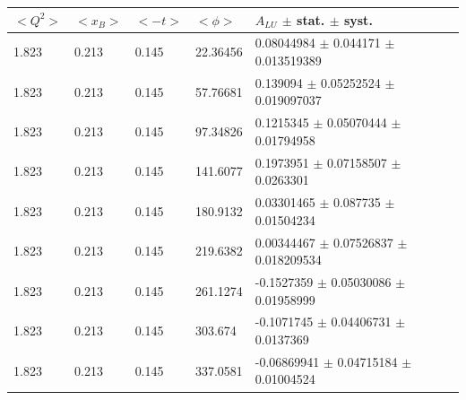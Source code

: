 \begin{table}[!h]
   \begin{center}
      \begin{tabular}{||l|l|l|l|l||}
         \hline
 $<Q^{2}>$ & $<x_{B}>$ & $<-t>$ & $<\phi>$ & $A_{LU}$ $\pm$ stat. $\pm$ syst.\\
  \hline
   1.823 & 0.213 & 0.145 &   22.36456  &   0.08044984  $\pm$  0.044171     $\pm$  0.013519389    \\
   1.823 & 0.213 & 0.145 &   57.76681  &   0.139094    $\pm$  0.05252524   $\pm$  0.019097037    \\
   1.823 & 0.213 & 0.145 &   97.34826  &   0.1215345   $\pm$  0.05070444   $\pm$  0.01794958     \\
   1.823 & 0.213 & 0.145 &   141.6077  &   0.1973951   $\pm$  0.07158507   $\pm$  0.0263301      \\
   1.823 & 0.213 & 0.145 &   180.9132  &   0.03301465  $\pm$  0.087735     $\pm$  0.01504234     \\
   1.823 & 0.213 & 0.145 &   219.6382  &   0.00344467  $\pm$  0.07526837   $\pm$  0.018209534    \\
   1.823 & 0.213 & 0.145 &   261.1274  &  -0.1527359   $\pm$  0.05030086   $\pm$  0.01958999     \\
   1.823 & 0.213 & 0.145 &   303.674   &  -0.1071745   $\pm$  0.04406731   $\pm$  0.0137369      \\
   1.823 & 0.213 & 0.145 &   337.0581  &  -0.06869941  $\pm$  0.04715184   $\pm$  0.01004524     \\
 \hline
                                                                        

\end{tabular}
\end{center}
\end{table}
